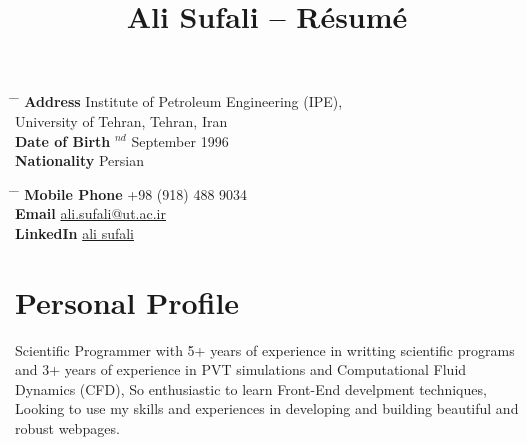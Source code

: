 \documentclass[10pt]{article} %
\begin{document}

\title{Ali Sufali -- Résumé} %


\parbox{0.5\textwidth}{ %
\begin{tabbing} %
\hspace{3cm} \= \hspace{4cm} \= \kill %
{\bf Address} \> Institute of Petroleum Engineering (IPE), \\ %
\> University of Tehran, Tehran, Iran \\ %
{\bf Date of Birth} $^{nd}$ September 1996 \\ %
{\bf Nationality} \> Persian %
\end{tabbing}}
\hfill %
\parbox{0.5\textwidth}{ %
\begin{tabbing} %
\hspace{3cm} \= \hspace{4cm} \= \kill %
{\bf Mobile Phone} \> +98 (918) 488 9034 \\ %
{\bf Email} \> \href{mailto:ali.sufali@ut.ac.ir}{ali.sufali@ut.ac.ir} \\ %
{\bf LinkedIn} \> \href{https://www.linkedin.com/in/ali-sufali/}{ali sufali}
\end{tabbing}}



\section{Personal Profile}

Scientific Programmer with 5+ years of experience in writting scientific programs and 3+ years of experience in PVT simulations and Computational Fluid Dynamics (CFD), So enthusiastic to learn Front-End develpment techniques, Looking to use my skills and experiences in developing and building beautiful and robust webpages.
\end{document}
